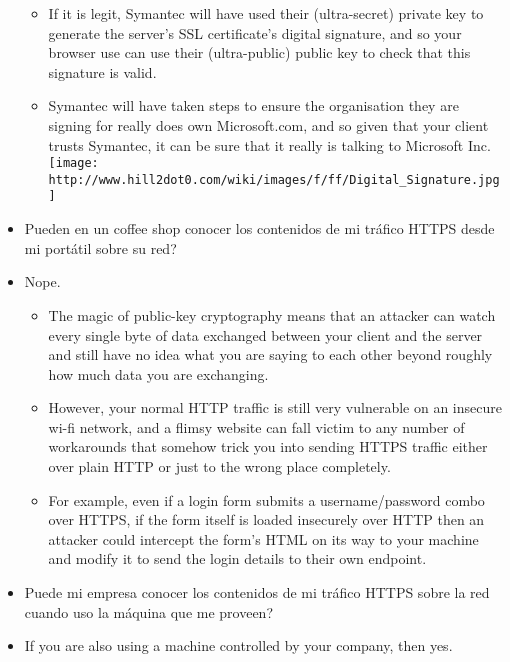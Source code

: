 \begin{itemize}
  \begin{itemize}
  \itemsep1pt\parskip0pt
  \item
    If it is legit, Symantec will have used their (ultra-secret) private
    key to generate the server's SSL certificate's digital signature,
    and so your browser use can use their (ultra-public) public key to
    check that this signature is valid.
  \item
    Symantec will have taken steps to ensure the organisation they are
    signing for really does own Microsoft.com, and so given that your
    client trusts Symantec, it can be sure that it really is talking to
    Microsoft Inc.
    \texttt{[image: http://www.hill2dot0.com/wiki/images/f/ff/Digital\_Signature.jpg]}
  \end{itemize}
\item
  Pueden en un coffee shop conocer los contenidos de mi tráfico HTTPS
  desde mi portátil sobre su red?
\item
  Nope.

  \begin{itemize}
  \itemsep1pt\parskip0pt
  \item
    The magic of public-key cryptography means that an attacker can
    watch every single byte of data exchanged between your client and
    the server and still have no idea what you are saying to each other
    beyond roughly how much data you are exchanging.
  \item
    However, your normal HTTP traffic is still very vulnerable on an
    insecure wi-fi network, and a flimsy website can fall victim to any
    number of workarounds that somehow trick you into sending HTTPS
    traffic either over plain HTTP or just to the wrong place
    completely.
  \item
    For example, even if a login form submits a username/password combo
    over HTTPS, if the form itself is loaded insecurely over HTTP then
    an attacker could intercept the form's HTML on its way to your
    machine and modify it to send the login details to their own
    endpoint.
  \end{itemize}
\item
  Puede mi empresa conocer los contenidos de mi tráfico HTTPS sobre la
  red cuando uso la máquina que me proveen?
\item
  If you are also using a machine controlled by your company, then yes.


\end{itemize}
